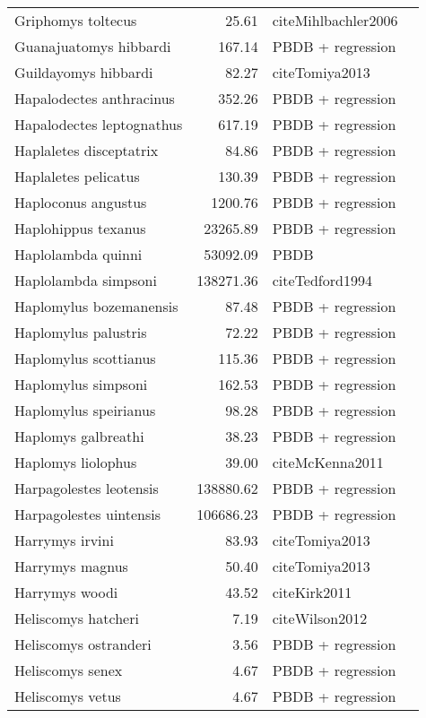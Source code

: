 \begin{table}[ht]
\begin{tabular}{lrll}
  Griphomys toltecus & 25.61 & cite{Mihlbachler2006} &  \\ 
  Guanajuatomys hibbardi & 167.14 & PBDB + regression &  \\ 
  Guildayomys hibbardi & 82.27 & cite{Tomiya2013} &  \\ 
  Hapalodectes anthracinus & 352.26 & PBDB + regression &  \\ 
  Hapalodectes leptognathus & 617.19 & PBDB + regression &  \\ 
  Haplaletes disceptatrix & 84.86 & PBDB + regression &  \\ 
  Haplaletes pelicatus & 130.39 & PBDB + regression &  \\ 
  Haploconus angustus & 1200.76 & PBDB + regression &  \\ 
  Haplohippus texanus & 23265.89 & PBDB + regression &  \\ 
  Haplolambda quinni & 53092.09 & PBDB &  \\ 
  Haplolambda simpsoni & 138271.36 & cite{Tedford1994} &  \\ 
  Haplomylus bozemanensis & 87.48 & PBDB + regression &  \\ 
  Haplomylus palustris & 72.22 & PBDB + regression &  \\ 
  Haplomylus scottianus & 115.36 & PBDB + regression &  \\ 
  Haplomylus simpsoni & 162.53 & PBDB + regression &  \\ 
  Haplomylus speirianus & 98.28 & PBDB + regression &  \\ 
  Haplomys galbreathi & 38.23 & PBDB + regression &  \\ 
  Haplomys liolophus & 39.00 & cite{McKenna2011} &  \\ 
  Harpagolestes leotensis & 138880.62 & PBDB + regression &  \\ 
  Harpagolestes uintensis & 106686.23 & PBDB + regression &  \\ 
  Harrymys irvini & 83.93 & cite{Tomiya2013} &  \\ 
  Harrymys magnus & 50.40 & cite{Tomiya2013} &  \\ 
  Harrymys woodi & 43.52 & cite{Kirk2011} &  \\ 
  Heliscomys hatcheri & 7.19 & cite{Wilson2012} &  \\ 
  Heliscomys ostranderi & 3.56 & PBDB + regression &  \\ 
  Heliscomys senex & 4.67 & PBDB + regression &  \\ 
  Heliscomys vetus & 4.67 & PBDB + regression &  \\ 

\end{tabular}
\end{table}
